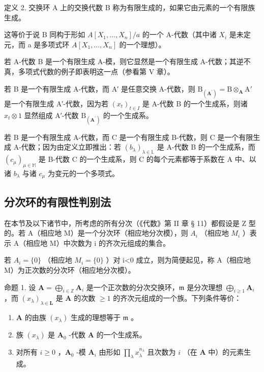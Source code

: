 定义 2. 交换环 A 上的交换代数 B 称为有限生成的，如果它由元素的一个有限族生成。

这等价于说 B 同构于形如 \(A[X_{1},\ldots,X_{n}]/a\) 的一个 A-代数（其中诸 \(X_{i}\) 是未定元，而 a 是多项式环 \(A[X_{1},\ldots,X_{n}]\) 的一个理想）。

若 A-代数 B 是一个有限生成 A-模，则它显然是一个有限生成 A-代数；其逆不真，多项式代数的例子即表明这一点（参看第 V 章）。

若 B 是一个有限生成 A-代数，而 A′ 是任意交换 A-代数，则 \(\mathrm{B}_{(\mathbf{A}^{\prime})} = \mathrm{B} \otimes_{\mathbf{A}} \mathrm{A}'\) 是一个有限生成 A′-代数，因为若 \((x_{t})_{t \in I}\) 是 A-代数 B 的一个生成系，则诸 \(x_{t} \otimes 1\) 显然组成 A′-代数 \(\mathrm{B}_{(\mathbf{A}^{\prime})}\) 的一个生成系。

若 B 是一个有限生成 A-代数，而 C 是一个有限生成 B-代数，则 C 是一个有限生成 A-代数；因为由定义立即推出：若 \((b_{\lambda})_{\lambda \in \mathbb{L}}\) 是 A-代数 B 的一个生成系，而 \((c_{\mu})_{\mu \in \mathbb{M}}\) 是 B-代数 C 的一个生成系，则 C 的每个元素都等于系数在 A 中、以诸 \(b_{\lambda}\) 与诸 \(c_{\mu}\) 为变元的一个多项式。

\subsection{分次环的有限性判别法}

在本节及以下诸节中，所考虑的所有分次（《代数》第 II 章 § 11）都假设是 Z 型的。若 A（相应地 M）是一个分次环（相应地分次模），则 \(A_{i}\) （相应地 \(M_{i}\) ）表示 A（相应地 M）中次数为 i 的齐次元组成的集合。

若 \(A_{i}=\{0\}\) （相应地 \(M_{i}=\{0\}\) ）对 i\textless0 成立，则为简便起见，称 A（相应地 M）为正次数的分次环（相应地分次模）。

命题 1. 设 \(\mathbf{A} = \bigoplus_{i\in \mathbb{Z}}\mathbf{A}_i\) 是一个正次数的分次交换环，\(\mathfrak{m}\) 是分次理想 \(\bigoplus_{i\geqslant 1}\mathbf{A}_i\) ，而 \((x_{\lambda})_{\lambda \in \mathbf{L}}\) 是 \(\mathbf{A}\) 的次数 \(\geqslant 1\) 的齐次元组成的一个族。下列条件等价：

\begin{enumerate}
\def\labelenumi{(\alph{enumi})}
\item
  \(\mathbf{A}\) 的由族 \((x_{\lambda})\) 生成的理想等于 \(\mathfrak{m}\) 。
\item
  族 \((x_{\lambda})\) 是 \(\mathbf{A}_0\) -代数 \(\mathbf{A}\) 的一个生成系。
\item
  对所有 \(i \geqslant 0\) ，\(\mathbf{A}_0\) -模 \(\mathbf{A}_i\) 由形如 \(\prod_{\lambda} x_{\lambda}^{n_{\lambda}}\) 且次数为 \(i\) （在 \(\mathbf{A}\) 中）的元素生成。
\end{enumerate}

